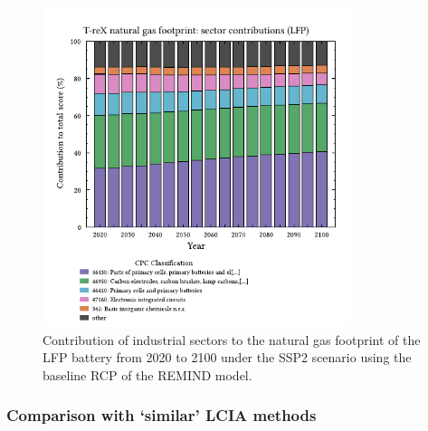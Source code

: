 \begin{figure}[H]
    \centering
    \includegraphics[width=9cm]{figures/T-reX-wastefootprint-sectorcontributions.pdf}
    \caption{Contribution of industrial sectors to the natural gas footprint of the LFP battery from 2020 to 2100 under the SSP2 scenario using the baseline RCP of the REMIND model.}\label{fig:cpc_contribution}
\end{figure}


\subsubsection{Comparison with `similar' LCIA methods}\label{sec:results-case_study-methodcomparison}

